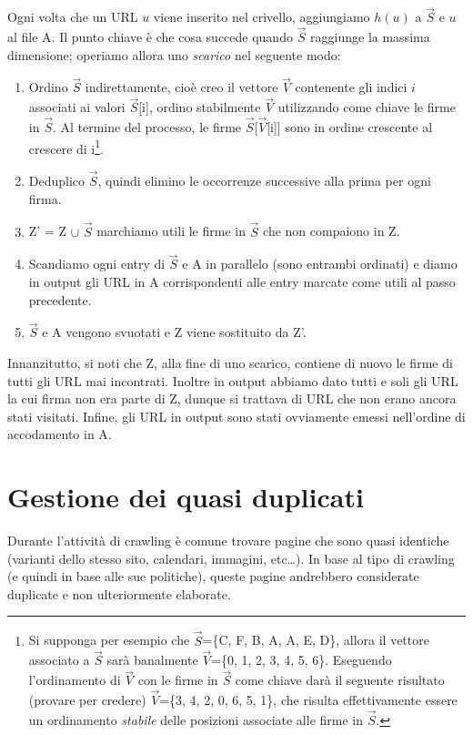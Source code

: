 Ogni volta che un URL $u$ viene inserito nel crivello, aggiungiamo $h(u)$ a $\vec{S}$ e $u$ al file A. Il punto chiave è che cosa succede quando $\vec{S}$ raggiunge la massima dimensione; operiamo allora uno \textit{scarico} nel seguente modo:
\begin{enumerate}
    \item Ordino $\vec{S}$ indirettamente, cioè creo il vettore $\vec{V}$ contenente gli indici $i$ associati ai valori $\vec{S}$[i], ordino stabilmente $\vec{V}$ utilizzando come chiave le firme in $\vec{S}$. Al termine del processo, le firme $\vec{S}$[$\vec{V}$[i]] sono in ordine crescente al crescere di i\footnote{Si supponga per esempio che $\vec{S}$=\{C, F, B, A, A, E, D\}, allora il vettore associato a $\vec{S}$ sarà banalmente $\vec{V}$=\{0, 1, 2, 3, 4, 5, 6\}. Eseguendo l'ordinamento di $\vec{V}$ con le firme in $\vec{S}$ come chiave darà il seguente risultato (provare per credere) $\vec{V}$=\{3, 4, 2, 0, 6, 5, 1\}, che risulta effettivamente essere un ordinamento \textit{stabile} delle posizioni associate alle firme in $\vec{S}$.}.
    \item Deduplico $\vec{S}$, quindi elimino le occorrenze successive alla prima per ogni firma.
    \item Z' = Z $\cup$ $\vec{S}$ marchiamo utili le firme in $\vec{S}$ che non compaiono in Z.
    \item Scandiamo ogni entry di $\vec{S}$ e A in parallelo (sono entrambi ordinati) e diamo in output gli URL in A corrispondenti alle entry marcate come utili al passo precedente.
    \item $\vec{S}$ e A vengono svuotati e Z viene sostituito da Z'.
\end{enumerate}
Innanzitutto, si noti che Z, alla fine di uno scarico, contiene di nuovo le firme di tutti gli URL mai incontrati. Inoltre in output abbiamo dato tutti e soli gli URL la cui firma non era parte di Z, dunque si trattava di URL che non erano ancora stati visitati. Infine, gli URL in output sono stati ovviamente emessi nell'ordine di accodamento in A.
\section{Gestione dei quasi duplicati}
Durante l'attività di crawling è comune trovare pagine che sono quasi identiche (varianti dello stesso sito, calendari, immagini, etc\dots). In base al tipo di crawling (e quindi in base alle sue politiche), queste pagine andrebbero considerate duplicate e non ulteriormente elaborate.

